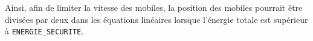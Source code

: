 Ainsi, afin de limiter la vitesse des mobiles, la position des mobiles pourrait être divisées par deux dans les équations linéaires lorsque l'énergie totale est supérieur à \texttt{ENERGIE\_SECURITE}.
%
%
